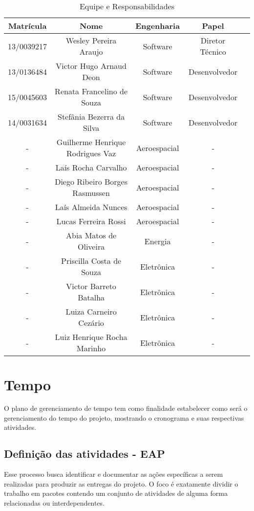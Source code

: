 \begin{table}[ht]
    \centering
	\label{equipe}
    \caption{Equipe e Responsabilidades}
    \begin{tabular}{ |c|c|c|c|c } 
        \hline
        Matrícula & Nome & Engenharia & Papel \\
        \hline
        13/0039217 & Wesley Pereira Araujo & Software & Diretor Técnico \\
        13/0136484 & Victor Hugo Arnaud Deon & Software & Desenvolvedor \\
        15/0045603 & Renata Francelino de Souza & Software & Desenvolvedor \\
        14/0031634 & Stefânia Bezerra da Silva & Software & Desenvolvedor \\
        - & Guilherme Henrique Rodrigues Vaz & Aeroespacial & - \\
        - & Laís Rocha Carvalho & Aeroespacial & - \\
        - & Diego Ribeiro Borges Rasmussen & Aeroespacial & - \\
        - & Laís Almeida Nunces & Aeroespacial & - \\
        - & Lucas Ferreira Rossi & Aeroespacial & - \\
        - & Abia Matos de Oliveira & Energia & - \\
        - & Priscilla Costa de Souza & Eletrônica & - \\
        - & Victor Barreto Batalha & Eletrônica & - \\
        - & Luiza Carneiro Cezário & Eletrônica & - \\
        - & Luiz Henrique Rocha Marinho & Eletrônica & - \\
        \hline
    \end{tabular}
\end{table}

\section{Tempo}

O plano de gerenciamento de tempo tem como finalidade estabelecer como será o gerenciamento do tempo do projeto, mostrando o cronograma e suas respectivas atividades.

\subsection{Definição das atividades - EAP}

Esse processo busca identificar e documentar as ações específicas a serem realizadas para produzir as entregas do projeto. O foco é exatamente dividir o trabalho em pacotes contendo um conjunto de atividades de alguma forma relacionadas ou interdependentes.

